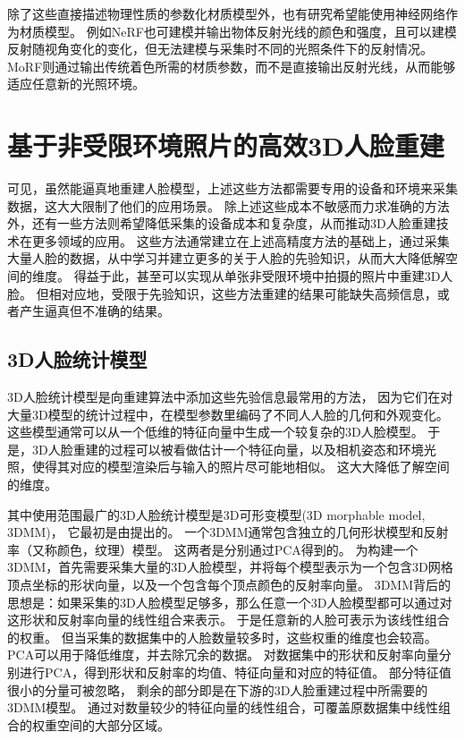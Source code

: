 除了这些直接描述物理性质的参数化材质模型外，也有研究希望能使用神经网络作为材质模型。
例如NeRF\citep{nerf}也可建模并输出物体反射光线的颜色和强度，且可以建模反射随视角变化的变化，但无法建模与采集时不同的光照条件下的反射情况。
MoRF\citep{MoRF}则通过输出传统着色所需的材质参数，而不是直接输出反射光线，从而能够适应任意新的光照环境。

\section{基于非受限环境照片的高效3D人脸重建}

可见，虽然能逼真地重建人脸模型，上述这些方法都需要专用的设备和环境来采集数据，这大大限制了他们的应用场景。
除上述这些成本不敏感而力求准确的方法外，还有一些方法则希望降低采集的设备成本和复杂度，从而推动3D人脸重建技术在更多领域的应用。
这些方法通常建立在上述高精度方法的基础上，通过采集大量人脸的数据，从中学习并建立更多的关于人脸的先验知识，从而大大降低解空间的维度。
得益于此，甚至可以实现从单张非受限环境中拍摄的照片中重建3D人脸。
但相对应地，受限于先验知识，这些方法重建的结果可能缺失高频信息，或者产生逼真但不准确的结果。

\subsection{3D人脸统计模型}

3D人脸统计模型是向重建算法中添加这些先验信息最常用的方法，
因为它们在对大量3D模型的统计过程中，在模型参数里编码了不同人人脸的几何和外观变化。
这些模型通常可以从一个低维的特征向量中生成一个较复杂的3D人脸模型。
于是，3D人脸重建的过程可以被看做估计一个特征向量，以及相机姿态和环境光照，使得其对应的模型渲染后与输入的照片尽可能地相似。
这大大降低了解空间的维度。

其中使用范围最广的3D人脸统计模型是3D可形变模型(3D morphable model, 3DMM)，
它最初是由\citet{3DMM}提出的。
一个3DMM通常包含独立的几何形状模型和反射率（又称颜色，纹理）模型。
这两者是分别通过PCA得到的。
为构建一个3DMM，首先需要采集大量的3D人脸模型，并将每个模型表示为一个包含3D网格顶点坐标的形状向量，以及一个包含每个顶点颜色的反射率向量。
3DMM背后的思想是：如果采集的3D人脸模型足够多，那么任意一个3D人脸模型都可以通过对这形状和反射率向量的线性组合来表示。
于是任意新的人脸可表示为该线性组合的权重。
但当采集的数据集中的人脸数量较多时，这些权重的维度也会较高。
PCA可以用于降低维度，并去除冗余的数据。
对数据集中的形状和反射率向量分别进行PCA，得到形状和反射率的均值、特征向量和对应的特征值。
部分特征值很小的分量可被忽略，
剩余的部分即是在下游的3D人脸重建过程中所需要的3DMM模型。
通过对数量较少的特征向量的线性组合，可覆盖原数据集中线性组合的权重空间的大部分区域。

